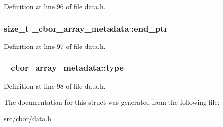 Definition at line 96 of file data.\-h.

\hypertarget{struct__cbor__array__metadata_a388742d0b665ba1775ad89858f3049cb}{
\subsubsection[{end\-\_\-ptr}]{\setlength{\rightskip}{0pt plus 5cm}size\-\_\-t \-\_\-cbor\-\_\-array\-\_\-metadata\-::end\-\_\-ptr}}\label{struct__cbor__array__metadata_a388742d0b665ba1775ad89858f3049cb}


Definition at line 97 of file data.\-h.

\hypertarget{struct__cbor__array__metadata_a0c376239d3aafcfe64ee7c74fd422f37}{
\subsubsection[{type}]{ \-\_\-cbor\-\_\-array\-\_\-metadata\-::type}}\label{struct__cbor__array__metadata_a0c376239d3aafcfe64ee7c74fd422f37}


Definition at line 98 of file data.\-h.



The documentation for this struct was generated from the following file\-:\begin{DoxyCompactItemize}
\item 
src/cbor/\hyperlink{data_8h}{data.\-h}\end{DoxyCompactItemize}
